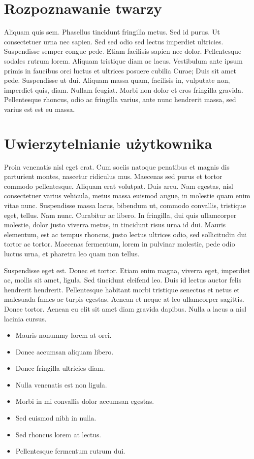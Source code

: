 \documentclass[eng,printmode]{mgr}
\begin{document}
\section{Rozpoznawanie twarzy}
Aliquam quis sem. Phasellus tincidunt fringilla metus. Sed id purus. Ut consectetuer urna nec sapien. Sed sed odio sed lectus imperdiet ultricies. Suspendisse semper congue pede. Etiam facilisis sapien nec dolor. Pellentesque sodales rutrum lorem. Aliquam tristique diam ac lacus. Vestibulum ante ipsum primis in faucibus orci luctus et ultrices posuere cubilia Curae; Duis sit amet pede. Suspendisse ut dui. Aliquam massa quam, facilisis in, vulputate non, imperdiet quis, diam. Nullam feugiat. Morbi non dolor et eros fringilla gravida. Pellentesque rhoncus, odio ac fringilla varius, ante nunc hendrerit massa, sed varius est est eu massa.

\section{Uwierzytelnianie użytkownika}
Proin venenatis nisl eget erat. Cum sociis natoque penatibus et magnis dis parturient montes, nascetur ridiculus mus. Maecenas sed purus et tortor commodo pellentesque. Aliquam erat volutpat. Duis arcu. Nam egestas, nisl consectetuer varius vehicula, metus massa euismod augue, in molestie quam enim vitae nunc. Suspendisse massa lacus, bibendum ut, commodo convallis, tristique eget, tellus. Nam nunc. Curabitur ac libero. In fringilla, dui quis ullamcorper molestie, dolor justo viverra metus, in tincidunt risus urna id dui. Mauris elementum, est ac tempus rhoncus, justo lectus ultrices odio, sed sollicitudin dui tortor ac tortor. Maecenas fermentum, lorem in pulvinar molestie, pede odio luctus urna, et pharetra leo quam non tellus.

Suspendisse eget est. Donec et tortor. Etiam enim magna, viverra eget, imperdiet ac, mollis sit amet, ligula. Sed tincidunt eleifend leo. Duis id lectus auctor felis hendrerit hendrerit. Pellentesque habitant morbi tristique senectus et netus et malesuada fames ac turpis egestas. Aenean et neque at leo ullamcorper sagittis. Donec tortor. Aenean eu elit sit amet diam gravida dapibus. Nulla a lacus a nisl lacinia cursus.

\begin{itemize}
\item Mauris nonummy lorem at orci.
\item Donec accumsan aliquam libero.
\item Donec fringilla ultricies diam.
\item Nulla venenatis est non ligula.
\item Morbi in mi convallis dolor accumsan egestas.
\item Sed euismod nibh in nulla.
\item Sed rhoncus lorem at lectus.
\item Pellentesque fermentum rutrum dui.
\end{itemize}
\end{document}
